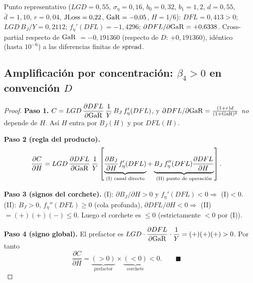 \begin{remark}
Punto representativo ($LGD=0{,}55$, $\sigma_\eta=0{,}16$, $b_0=0{,}32$, $b_1=1{,}2$, $d=0{,}55$, $\bar d=1{,}10$, $r=0{,}04$, $\mathrm{JLoss}=0{,}22$, $\mathrm{GaR}=-0{,}05$, $H=1/6$): $DFL=0{,}413>0$; $LGD\,B_J/Y=0{,}2112$; $f_\eta'(DFL)=-1{,}4296$; $\partial DFL/\partial\mathrm{GaR}=+0{,}6338$. Cross-partial respecto de $\mathrm{GaR}$ $=-0{,}191360$ (respecto de $D$: $+0{,}191360$), idéntico (hasta $10^{-6}$) a las diferencias finitas de $\mathrm{spread}$.
\end{remark}

\subsection{\texorpdfstring{Amplificación por concentración: $\beta_4>0$ en convención $D$}{Amplificacion por concentracion: beta4>0 en convencion D}}

\begin{proof}
\textbf{Paso 1.} $C=LGD\,\dfrac{\partial DFL}{\partial \mathrm{GaR}}\,\dfrac1Y\,B_J\,f_\eta'(DFL)$, y $\partial DFL/\partial\mathrm{GaR}=\frac{(1+r)d}{(1+\mathrm{GaR})^2}$ \emph{no} depende de $H$. Así $H$ entra por $B_J(H)$ y por $DFL(H)$.

\textbf{Paso 2 (regla del producto).}
\[
\frac{\partial C}{\partial H}=LGD\,\frac{\partial DFL}{\partial \mathrm{GaR}}\,\frac1Y\left[\underbrace{\frac{\partial B_J}{\partial H}f_\eta'(DFL)}_{\text{(I) canal directo}}+\underbrace{B_J\,f_\eta''(DFL)\frac{\partial DFL}{\partial H}}_{\text{(II) punto de operación}}\right].
\]

\textbf{Paso 3 (signos del corchete).}
(I): $\partial B_J/\partial H>0$ y $f_\eta'(DFL)<0\Rightarrow$ (I)$<0$.\quad
(II): $B_J>0$, $f_\eta''(DFL)\ge0$ (cola profunda), $\partial DFL/\partial H<0\Rightarrow$ (II)$=(+)(+)(-)\le0$.
Luego el corchete es $\le0$ (estrictamente $<0$ por (I)).

\textbf{Paso 4 (signo global).} El prefactor es $LGD\cdot\dfrac{\partial DFL}{\partial\mathrm{GaR}}\cdot\dfrac1Y=(+)(+)(+)>0$. Por tanto
\[
\frac{\partial C}{\partial H}=\underbrace{(>0)}_{\text{prefactor}}\times\underbrace{(<0)}_{\text{corchete}}<0. \qquad\blacksquare
\]
\end{proof}

